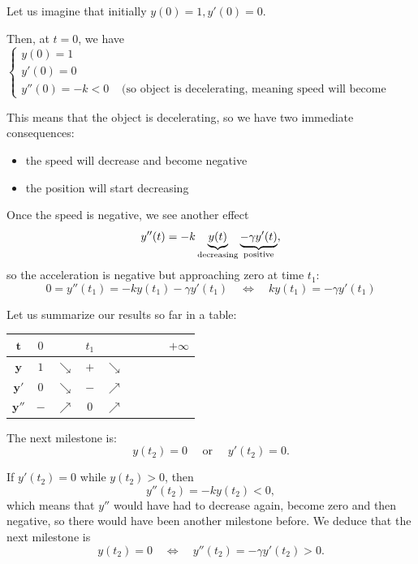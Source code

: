 Let us imagine that initially  \quad $y(0)=1, y'(0)=0$.

Then, at $t=0$, we have
$$
\begin{cases}
y(0)=1 \\
y'(0)=0 \\
y''(0)= -k < 0 & \text{ (so object is decelerating, meaning speed will become negative)}
\end{cases}
$$

This means that the object is decelerating, so we have two immediate consequences:
\begin{itemize}
	\item the speed will decrease and become negative
	\item the position will start decreasing
\end{itemize}

Once the speed is negative, we see another effect
$$
y''(t) = -k\underbrace{y(t)}_{\text{decreasing}} \underbrace{- \gamma y'(t)}_{\rm positive},
$$
so the acceleration is negative but approaching zero at time $t_1$:
$$
0=y''(t_1) = -ky(t_1) - \gamma y'(t_1)
\quad \Leftrightarrow \quad k y(t_1) = - \gamma y'(t_1)
$$

Let us summarize our results so far in a table:

\begin{graybox}
\begin{center}
\begin{tabular}{c||c|c|c|c|c|c|c|c}
$\pmb{t}$	& $0$ 		& 			& $t_1$ &  			& 			& 	&	& \hspace{1cm} $+\infty$ \\[5pt] \hline\hline
$\pmb{y}$ & $1$	& $ \searrow$	& $+$ &	$\searrow$ 	&	&  \hspace{0.5cm}	&  	& 	\\[5pt] \hline
$\pmb{y'}$ & $0$ &	$\searrow$	& $-$ & $\nearrow$ & 	&  	& &	\\[5pt] \hline
$\pmb{y''}$ & $-$		& $\nearrow$ & 0  & $\nearrow$  & 	& 	&  &	\\[5pt] \hline
\end{tabular}
\end{center}
\end{graybox}

The next milestone is:
$$
y(t_2)=0 \quad \text{ or } \quad y'(t_2)=0.
$$

If $y'(t_2)=0$ while $y(t_2)>0$, then 
$$
y''(t_2) = -ky(t_2) <0,
$$
which means that $y''$ would have had to decrease again, become zero and then negative, so there would have been another milestone before.
We deduce that the next milestone is
$$
y(t_2)=0
\quad \Leftrightarrow \quad	
	y''(t_2) = -\gamma y'(t_2) > 0.
$$

